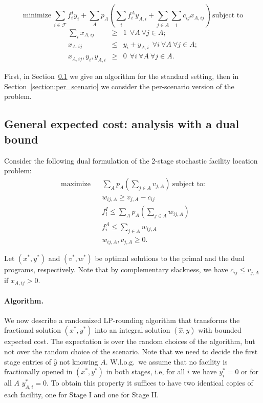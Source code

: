 \documentclass[11pt]{article}
\begin{document}
\[ \mbox{minimize} ~
\sum_{i \in \mathcal{F}} f_i^I y_i +
\sum_A p_A (\sum_i f_i^A y_{A,i} + \sum_{j \in A} \sum_i c_{ij} x_{A,ij})~
\mbox{subject to} \]
\begin{eqnarray*}
\sum_i x_{A,ij} & \geq & 1 ~~\forall A ~\forall j \in A; 
\label{eqn:facloc-assign} \\
x_{A,ij} & \leq & y_i + y_{A,i} ~~\forall i ~\forall A ~\forall j \in A; 
\label{eqn:facloc-xleqy} \\
x_{A,ij}, y_i, y_{A,i} & \geq & 0 ~~\forall i ~\forall A ~\forall j \in A.
\nonumber
\end{eqnarray*}

First, in Section~\ref{section:general_exp} we give an algorithm for the standard setting,
then in Section~\ref{section:per_scenario}  we consider the per-scenario version of the problem.

\subsection{General expected cost: analysis with a dual bound}
\label{section:general_exp}
Consider the following dual formulation of the 2-stage stochastic facility location problem: 
\begin{eqnarray*}
 \mbox{maximize} && \sum_{A} p_A (\sum_{j \in A} v_{j,A})
~\mbox{subject to:}\\
 && w_{ij,A} \geq v_{j,A} - c_{ij}\\
 && f_i^I \leq \sum_{A} p_A (\sum_{j \in A} w_{ij,A})\\
 && f_i^A \leq \sum_{j \in A} w_{ij,A}\\
 &&  w_{ij,A},v_{j,A} \geq 0.
\end{eqnarray*}

Let $(x^*,y^*)$ and $(v^*,w^*)$ be optimal solutions to the primal
and the dual programs, respectively. Note that by complementary 
slackness, we have
$c_{ij} \leq v_{j,A}$ if $x_{A,ij} > 0$. 

\paragraph{Algorithm.}

We now describe a randomized LP-rounding algorithm that transforms the fractional 
solution $(x^*,y^*)$ into an integral solution $(\hat{x},\hat{y})$ with bounded expected cost.
The expectation is over the random choices of the algorithm, but not over the
random choice of the scenario. Note that we need to decide the first stage entries of $\hat{y}$
not knowing $A$. W.l.o.g.\ we assume that no facility is fractionally opened in $(x^*,y^*)$ 
in both stages, i.e, for all $i$ we have $y^*_i = 0$ or for all $A$ $y^*_{A,i} = 0$.
To obtain this property it suffices to have two identical copies of each facility,
one for Stage I and one for Stage II.
\end{document}
